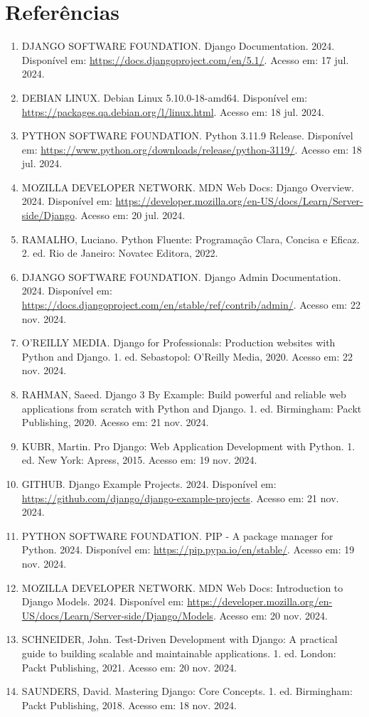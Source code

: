 \documentclass[11pt]{article} %
\begin{document}
\section{Referências}
\begin{enumerate}
    \item DJANGO SOFTWARE FOUNDATION. Django Documentation. 2024. Disponível em: \url{https://docs.djangoproject.com/en/5.1/}. Acesso em: 17 jul. 2024.
    \item DEBIAN LINUX. Debian Linux 5.10.0-18-amd64. Disponível em: \url{https://packages.qa.debian.org/l/linux.html}. Acesso em: 18 jul. 2024.
    \item PYTHON SOFTWARE FOUNDATION. Python 3.11.9 Release. Disponível em: \url{https://www.python.org/downloads/release/python-3119/}. Acesso em: 18 jul. 2024.
    \item MOZILLA DEVELOPER NETWORK. MDN Web Docs: Django Overview. 2024. Disponível em: \url{https://developer.mozilla.org/en-US/docs/Learn/Server-side/Django}. Acesso em: 20 jul. 2024.
    \item RAMALHO, Luciano. Python Fluente: Programação Clara, Concisa e Eficaz. 2. ed. Rio de Janeiro: Novatec Editora, 2022.
    \item DJANGO SOFTWARE FOUNDATION. Django Admin Documentation. 2024. Disponível em: \url{https://docs.djangoproject.com/en/stable/ref/contrib/admin/}. Acesso em: 22 nov. 2024.
    \item O'REILLY MEDIA. Django for Professionals: Production websites with Python and Django. 1. ed. Sebastopol: O'Reilly Media, 2020. Acesso em: 22 nov. 2024.
    \item RAHMAN, Saeed. Django 3 By Example: Build powerful and reliable web applications from scratch with Python and Django. 1. ed. Birmingham: Packt Publishing, 2020. Acesso em: 21 nov. 2024.
    \item KUBR, Martin. Pro Django: Web Application Development with Python. 1. ed. New York: Apress, 2015. Acesso em: 19 nov. 2024.
    \item GITHUB. Django Example Projects. 2024. Disponível em: \url{https://github.com/django/django-example-projects}. Acesso em: 21 nov. 2024.
    \item PYTHON SOFTWARE FOUNDATION. PIP - A package manager for Python. 2024. Disponível em: \url{https://pip.pypa.io/en/stable/}. Acesso em: 19 nov. 2024.
    \item MOZILLA DEVELOPER NETWORK. MDN Web Docs: Introduction to Django Models. 2024. Disponível em: \url{https://developer.mozilla.org/en-US/docs/Learn/Server-side/Django/Models}. Acesso em: 20 nov. 2024.
    \item SCHNEIDER, John. Test-Driven Development with Django: A practical guide to building scalable and maintainable applications. 1. ed. London: Packt Publishing, 2021. Acesso em: 20 nov. 2024.
    \item SAUNDERS, David. Mastering Django: Core Concepts. 1. ed. Birmingham: Packt Publishing, 2018. Acesso em: 18 nov. 2024.
\end{enumerate}
\end{document}
